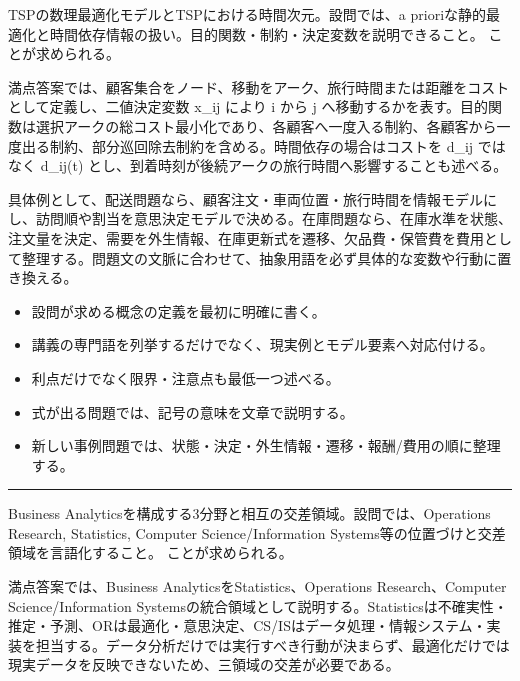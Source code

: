 \clearpage{}
TSPの数理最適化モデルとTSPにおける時間次元。設問では、a prioriな静的最適化と時間依存情報の扱い。目的関数・制約・決定変数を説明できること。 ことが求められる。\par
{}
満点答案では、顧客集合をノード、移動をアーク、旅行時間または距離をコストとして定義し、二値決定変数 x\_ij により i から j へ移動するかを表す。目的関数は選択アークの総コスト最小化であり、各顧客へ一度入る制約、各顧客から一度出る制約、部分巡回除去制約を含める。時間依存の場合はコストを d\_ij ではなく d\_ij(t) とし、到着時刻が後続アークの旅行時間へ影響することも述べる。\par
{}
具体例として、配送問題なら、顧客注文・車両位置・旅行時間を情報モデルにし、訪問順や割当を意思決定モデルで決める。在庫問題なら、在庫水準を状態、注文量を決定、需要を外生情報、在庫更新式を遷移、欠品費・保管費を費用として整理する。問題文の文脈に合わせて、抽象用語を必ず具体的な変数や行動に置き換える。\par
{}
\begin{itemize}
\item 設問が求める概念の定義を最初に明確に書く。
\item 講義の専門語を列挙するだけでなく、現実例とモデル要素へ対応付ける。
\item 利点だけでなく限界・注意点も最低一つ述べる。
\item 式が出る問題では、記号の意味を文章で説明する。
\item 新しい事例問題では、状態・決定・外生情報・遷移・報酬/費用の順に整理する。
\end{itemize}
\vspace{2mm}\hrule\vspace{2mm}
Business Analyticsを構成する3分野と相互の交差領域。設問では、Operations Research, Statistics, Computer Science/Information Systems等の位置づけと交差領域を言語化すること。 ことが求められる。\par
{}
満点答案では、Business AnalyticsをStatistics、Operations Research、Computer Science/Information Systemsの統合領域として説明する。Statisticsは不確実性・推定・予測、ORは最適化・意思決定、CS/ISはデータ処理・情報システム・実装を担当する。データ分析だけでは実行すべき行動が決まらず、最適化だけでは現実データを反映できないため、三領域の交差が必要である。\par
